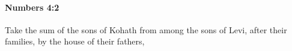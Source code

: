 
		\paragraph{Numbers 4:2} %
			\label{NUMBERS-4-2}

			Take the sum of the sons of Kohath from among the sons of Levi, after their families, by the house of their fathers,


